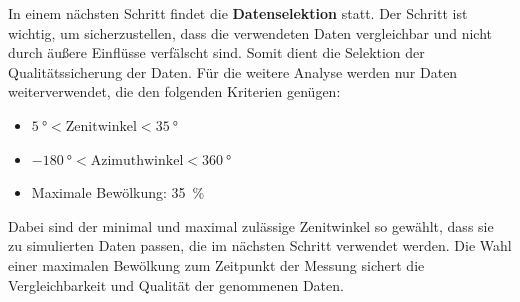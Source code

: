 In einem nächsten Schritt findet die \textbf{Datenselektion} statt. Der Schritt
ist wichtig, um sicherzustellen, dass die verwendeten Daten vergleichbar und
nicht durch äußere Einflüsse verfälscht sind. Somit dient die Selektion der
Qualitätssicherung der Daten. Für die weitere Analyse werden nur Daten
weiterverwendet, die den folgenden Kriterien genügen:
\begin{itemize}
  \item $\SI{5}{\degree}<\text{Zenitwinkel}<\SI{35}{\degree}$
  \item $\SI{-180}{\degree}<\text{Azimuthwinkel}<\SI{360}{\degree}$
  \item Maximale Bewölkung: \SI{35}{\percent}
\end{itemize}
Dabei sind der minimal und maximal zulässige Zenitwinkel so gewählt, dass sie zu
simulierten Daten passen, die im nächsten Schritt verwendet werden. Die Wahl
einer maximalen Bewölkung zum Zeitpunkt der Messung sichert die Vergleichbarkeit
und Qualität der genommenen Daten.

